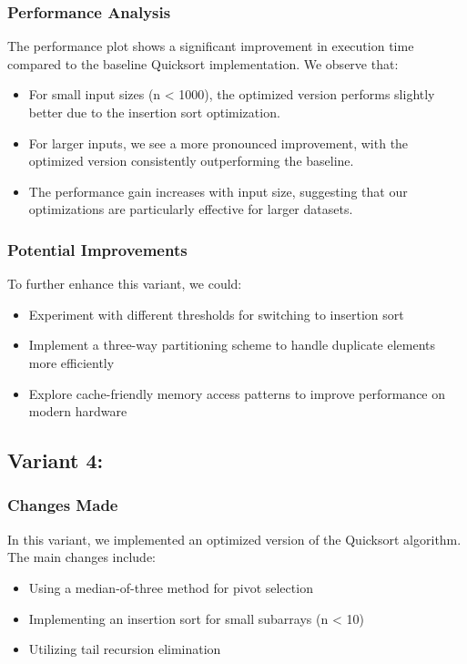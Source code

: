 \documentclass[twocolumn]{article}
\begin{document}
\subsubsection{Performance Analysis}

The performance plot shows a significant improvement in execution time compared to the baseline Quicksort implementation. We observe that:
\begin{itemize}
    \item For small input sizes (n < 1000), the optimized version performs slightly better due to the insertion sort optimization.
    \item For larger inputs, we see a more pronounced improvement, with the optimized version consistently outperforming the baseline.
    \item The performance gain increases with input size, suggesting that our optimizations are particularly effective for larger datasets.
\end{itemize}

\subsubsection{Potential Improvements}
To further enhance this variant, we could:
\begin{itemize}
    \item Experiment with different thresholds for switching to insertion sort
    \item Implement a three-way partitioning scheme to handle duplicate elements more efficiently
    \item Explore cache-friendly memory access patterns to improve performance on modern hardware
\end{itemize}

\subsection{Variant 4:}

\subsubsection{Changes Made}
In this variant, we implemented an optimized version of the Quicksort algorithm. The main changes include:
\begin{itemize}
    \item Using a median-of-three method for pivot selection
    \item Implementing an insertion sort for small subarrays (n < 10)
    \item Utilizing tail recursion elimination
\end{itemize}
\end{document}
